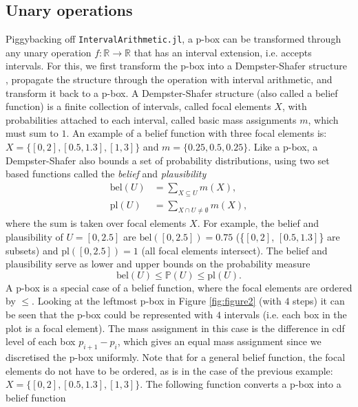\documentclass{juliacon}
\begin{document}
\subsection{Unary operations}
Piggybacking off \texttt{IntervalArithmetic.jl}\cite{david_p_sanders_2021_5519761}, a p-box can be transformed through any unary operation $f: \mathbb{R} \rightarrow \mathbb{R}$ that has  an interval extension, i.e. accepts intervals. For this, we first transform the p-box into a Dempster-Shafer structure \cite{dempster2008upper,shafer1976mathematical}, propagate the structure through the operation with interval arithmetic, and transform it back to a p-box. A Dempster-Shafer structure (also called a belief function) is a finite collection of intervals, called focal elements $X$, with probabilities attached to each interval, called basic mass assignments $m$, which must sum to $1$. An example of a belief function with three focal elements is: $X = \{[0, 2], [0.5, 1.3], [1, 3]\}$ and $m = \{0.25, 0.5, 0.25\}$. Like a p-box, a Dempster-Shafer also bounds a set of probability distributions, using two set based functions called the \textit{belief} and \textit{plausibility}
\begin{align*}
  \text{bel}(U) &= \sum_{X \subseteq U} m(X) ,\\ 
  \text{pl}(U) &= \sum_{X \cap U \neq \emptyset} m(X) ,
\end{align*}
where the sum is taken over focal elements $X$. For example, the belief and plausibility of $U = [0,2.5]$ are $\text{bel}([0,2.5]) = 0.75$ (\{$[0, 2]$, $[0.5, 1.3]$\} are subsets) and $\text{pl}([0, 2.5]) = 1$ (all focal elements intersect). The belief and plausibility serve as lower and upper bounds on the probability measure
\begin{equation*}
  \text{bel}(U) \leq \mathbb{P}(U) \leq \text{pl}(U) .
\end{equation*}
A p-box is a special case of a belief function, where the focal elements are ordered by $\leq$. Looking at the leftmost p-box in Figure \ref{fig:figure2} (with $4$ steps) it can be seen that the p-box could be represented with $4$ intervals (i.e. each box in the plot is a focal element). The mass assignment
in this case is the difference in cdf level of each box $p_{i+1} - p_{i}$, which gives an equal mass assignment since we discretised the p-box uniformly. Note that for a general belief function, the focal elements do not have to be ordered, as is in the case of the previous example: $X = \{[0, 2], [0.5, 1.3], [1, 3]\}$. The following function converts a p-box into a belief function
\end{document}
